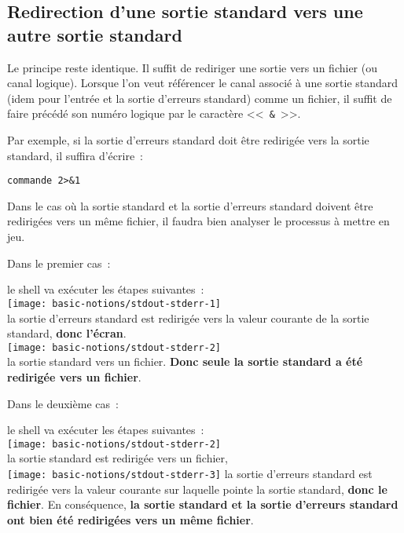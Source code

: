 \subsection{Redirection d'une sortie standard vers une autre sortie standard}

Le principe reste identique. Il suffit de rediriger une sortie vers un
fichier (ou canal logique). Lorsque l'on veut r{\'e}f{\'e}rencer le canal
associ{\'e} {\`a} une sortie standard (idem pour l'entr{\'e}e et la sortie d'erreurs
standard) comme un fichier, il suffit de faire pr{\'e}c{\'e}d{\'e} son num{\'e}ro
logique par le caract{\`e}re <<~\texttt{\&}~>>.

Par exemple, si la sortie d'erreurs standard doit {\^e}tre redirig{\'e}e vers la
sortie standard, il
suffira d'{\'e}crire~:
\begin{verbatim}
commande 2>&1
\end{verbatim}

Dans le cas o{\`u} la sortie standard et la sortie d'erreurs standard doivent {\^e}tre redirig{\'e}es
vers un m{\^e}me fichier, il faudra bien analyser le processus {\`a} mettre en jeu.

Dans le premier cas~:
\begin{center}
\end{center}
le shell va ex{\'e}cuter les {\'e}tapes suivantes~:\\[0.5cm]
\texttt{[image: basic-notions/stdout-stderr-1]}	\\
la sortie d'erreurs standard est redirig{\'e}e vers la valeur courante de la sortie
standard, {\bf donc l'{\'e}cran}.\\[0.5cm]
\texttt{[image: basic-notions/stdout-stderr-2]} \\
la sortie standard vers un fichier. {\bf Donc seule la sortie standard a
{\'e}t{\'e} redirig{\'e}e vers un fichier}.

Dans le deuxi{\`e}me cas~:
\begin{center}
\end{center}
le shell va ex{\'e}cuter les {\'e}tapes suivantes~:\\[0.5cm]
	\texttt{[image: basic-notions/stdout-stderr-2]}	\\
la sortie standard est redirig{\'e}e vers un fichier,\\[0.5cm]
	\texttt{[image: basic-notions/stdout-stderr-3]}
la sortie d'erreurs standard est redirig{\'e}e vers la valeur courante sur laquelle
pointe la sortie standard, {\bf donc le fichier}. En cons{\'e}quence,
{\bf la sortie standard et la sortie d'erreurs standard ont bien {\'e}t{\'e} redirig{\'e}es vers un
m{\^e}me fichier}.


